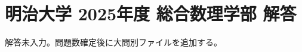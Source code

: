 \documentclass[../../uem_mat_mei_a.tex]{subfiles}
\begin{document}
    \section{明治大学 2025年度 総合数理学部 解答}

    解答未入力。問題数確定後に大問別ファイルを追加する。
\end{document}
